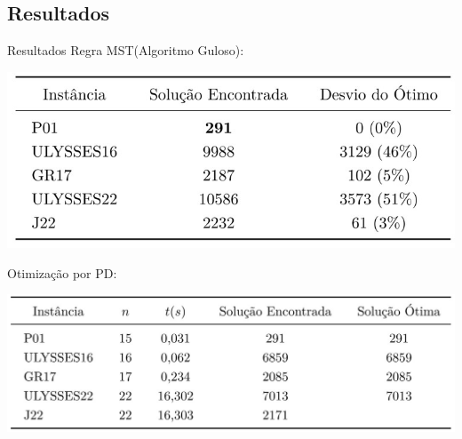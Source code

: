 \documentclass{beamer}
\begin{document}
\subsection{Resultados}
\begin{frame}{Resultados}
Regra MST(Algoritmo Guloso):
\begin{table}[h]
\includegraphics[scale=0.6]{Tabela1}
\end{table}
Otimização por PD:
\begin{table}[h]
\includegraphics[scale=0.5]{Tabela2}
\end{table}
\end{frame}
\end{document}
